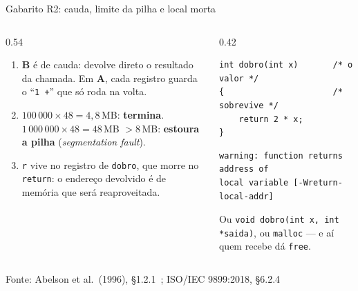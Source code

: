 \documentclass[aspectratio=169]{beamer}
\newcommand{\fonte}[1]{\vfill\hfill{\scriptsize\textcolor{UFSGray}{Fonte: #1}}}
\begin{document}
\begin{frame}[fragile]{Gabarito R2: cauda, limite da pilha e local morta}
  \begin{columns}[T]
    \begin{column}{0.54\textwidth}
      \small
      \begin{enumerate}
        \item[(a)] \textbf{B} é de cauda: devolve direto o resultado da
          chamada. Em \textbf{A}, cada registro guarda o \mbox{``\texttt{1~+}''}
          que só roda na volta.
        \item[(b)] $100\,000 \times 48 = 4{,}8$\,MB: \textbf{termina}.
          $1\,000\,000 \times 48 = 48$\,MB $> 8$\,MB: \textbf{estoura a pilha}
          (\emph{segmentation fault}).
        \item[(c)] \texttt{r} vive no registro de \texttt{dobro}, que morre no
          \texttt{return}: o endereço devolvido é de memória que será
          reaproveitada.
      \end{enumerate}
    \end{column}
    \begin{column}{0.42\textwidth}
\begin{lstlisting}[style=tinyC]
int dobro(int x)       /* o valor */
{                      /* sobrevive */
    return 2 * x;
}
\end{lstlisting}
\begin{lstlisting}[style=shellStyle]
warning: function returns address of
local variable [-Wreturn-local-addr]
\end{lstlisting}
      \scriptsize Ou \texttt{void dobro(int x, int *saida)}, ou
      \texttt{malloc} --- e aí quem recebe dá \texttt{free}.
    \end{column}
  \end{columns}
  \fonte{Abelson et al.\ (1996), §1.2.1~\cite{abelson1996structure}; ISO/IEC 9899:2018, §6.2.4~\cite{iso2018c17}}
\end{frame}
\end{document}
